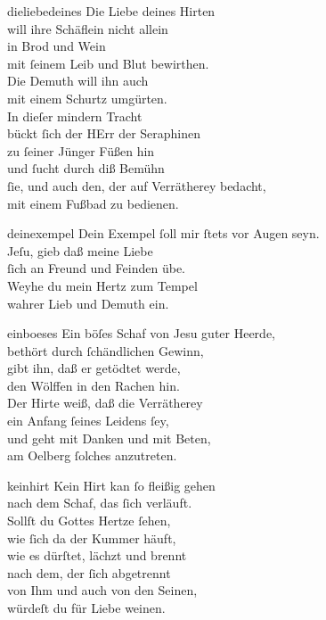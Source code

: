 \documentclass[tocstyle=ref-genre]{ees}
\begin{document}
{\begin{movement}{dieliebedeines}
  Die Liebe deines Hirten\\
  will ihre Schäflein nicht allein\\
  in Brod und Wein\\
  mit ſeinem Leib und Blut bewirthen.\\
  Die Demuth will ihn auch\\
  mit einem Schurtz umgürten.\\
  In dieſer mindern Tracht\\
  bückt ſich der HErr der Seraphinen\\
  zu ſeiner Jünger Füßen hin\\
  und ſucht durch diß Bemühn\\
  ſie, und auch den, der auf Verrätherey bedacht,\\
  mit einem Fußbad zu bedienen.
\end{movement}

\clearpage
\begin{movement}{deinexempel}
  Dein Exempel ſoll mir ſtets vor Augen seyn.\\
  Jeſu, gieb daß meine Liebe\\
  ſich an Freund und Feinden übe.\\
  Weyhe du mein Hertz zum Tempel\\
  wahrer Lieb und Demuth ein.
\end{movement}

\begin{movement}{einboeses}
  Ein böſes Schaf von Jesu guter Heerde,\\
  bethört durch ſchändlichen Gewinn,\\
  gibt ihn, daß er getödtet werde,\\
  den Wölffen in den Rachen hin.\\
  Der Hirte weiß, daß die Verrätherey\\
  ein Anfang ſeines Leidens ſey,\\
  und geht mit Danken und mit Beten,\\
  am Oelberg ſolches anzutreten.
\end{movement}

\begin{movement}{keinhirt}
  \voice[Coro]
  Kein Hirt kan ſo fleißig gehen\\
  nach dem Schaf, das ſich verläuft.\\
  Sollſt du Gottes Hertze ſehen,\\
  wie ſich da der Kummer häuft,\\
  wie es dürſtet, lächzt und brennt\\
  nach dem, der ſich abgetrennt\\
  von Ihm und auch von den Seinen,\\
  würdeſt du für Liebe weinen.
\end{movement}

}
\end{document}
